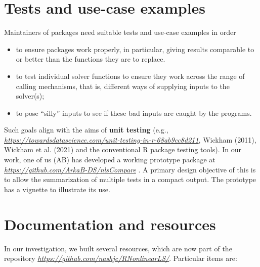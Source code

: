 \hypertarget{tests-and-use-case-examples}{%
\section{Tests and use-case examples}\label{tests-and-use-case-examples}}

Maintainers of packages need suitable tests and use-case examples in order

\begin{itemize}
\tightlist
\item
  to ensure packages work properly, in particular, giving
  results comparable to or better than the functions they are to replace.
\item
  to test individual solver functions to ensure they work across the range of
  calling mechanisms, that is, different ways of supplying inputs to the solver(s);
\item
  to pose ``silly'' inputs to see if these bad inputs are caught by the programs.
\end{itemize}

Such goals align with the aims of \textbf{unit testing}
(e.g., \emph{\url{https://towardsdatascience.com/unit-testing-in-r-68ab9cc8d211}}, Wickham (2011), Wickham et al. (2021)
and the conventional R package testing tools).
In our work, one of us (AB) has developed a working prototype package at \emph{\url{https://github.com/ArkaB-DS/nlsCompare}} .
A primary design objective of this is to allow the summarization of multiple tests in
a compact output. The prototype has a vignette to illustrate its use.

\hypertarget{documentation-and-resources}{%
\section{Documentation and resources}\label{documentation-and-resources}}

In our investigation, we built several resources, which are now part of
the repository \emph{\url{https://github.com/nashjc/RNonlinearLS/}}. Particular items
are:


